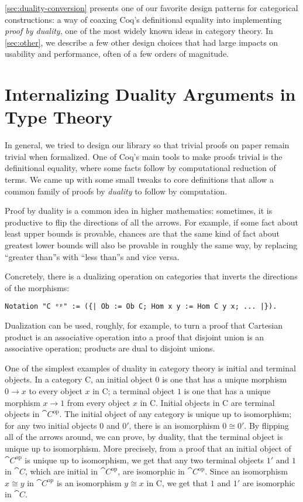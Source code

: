 \autoref{sec:duality-conversion} presents one of our favorite design patterns for categorical constructions: a way of coaxing Coq's definitional equality into implementing \emph{proof by duality}, one of the most widely known ideas in category theory.
In \autoref{sec:other}, we describe a few other design choices that had large impacts on usability and performance, often of a few orders of magnitude.


\section{Internalizing Duality Arguments in Type Theory} \label{sec:duality-conversion}

  In general, we tried to design our library so that trivial proofs on paper remain trivial when formalized.
  One of Coq's main tools to make proofs trivial is the definitional equality, where some facts follow by computational reduction of terms.
  We came up with some small tweaks to core definitions that allow a common family of proofs by \emph{duality} to follow by computation.

  Proof by duality is a common idea in higher mathematics: sometimes, it is productive to flip the directions of all the arrows.
  For example, if some fact about least upper bounds is provable, chances are that the same kind of fact about greatest lower bounds will also be provable in roughly the same way, by replacing ``greater than''s with ``less than''s and vice versa.

  Concretely, there is a dualizing operation on categories that inverts the directions of the morphisms:
\begin{verbatim}
Notation "C ᵒᵖ" := ({| Ob := Ob C; Hom x y := Hom C y x; ... |}).
\end{verbatim}

  Dualization can be used, roughly, for example, to turn a proof that Cartesian product is an associative operation into a proof that disjoint union is an associative operation; products are dual to disjoint unions.

  One of the simplest examples of duality in category theory is initial and terminal objects.
  In a category \cat C, an initial object $0$ is one that has a unique morphism $0 \to x$ to every object $x$ in \cat C; a terminal object $1$ is one that has a unique morphism $x \to 1$ from every object $x$ in \cat C.
  Initial objects in \cat C are terminal objects in $\cat{C}^\text{op}$.
  The initial object of any category is unique up to isomorphism; for any two initial objects $0$ and $0'$, there is an isomorphism $0 \cong 0'$.
  By flipping all of the arrows around, we can prove, by duality, that the terminal object is unique up to isomorphism.  More precisely, from a proof that an initial object of $\cat{C}^{\text{op}}$ is unique up to isomorphism, we get that any two terminal objects $1'$ and $1$ in $\cat{C}$, which are initial in $\cat{C}^{\text{op}}$, are isomorphic in $\cat{C}^{\text{op}}$.  Since an isomorphism $x \cong y$ in $\cat{C}^\text{op}$ is an isomorphism $y \cong x$ in \cat C, we get that $1$ and $1'$ are isomorphic in $\cat C$.

